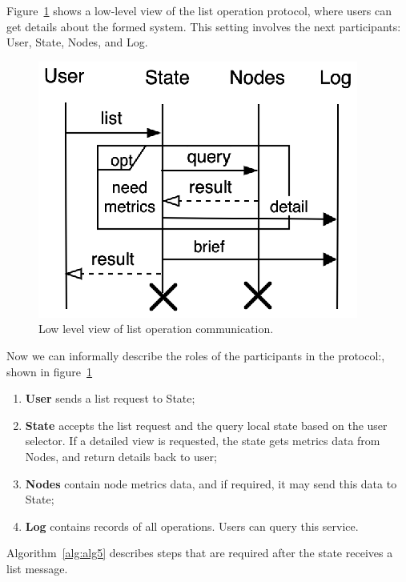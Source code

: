 Figure~\ref{fig:fig8} shows a low-level view of the list operation protocol, where users can get details about the formed system. This setting involves the next participants: User, State, Nodes, and Log. 

\begin{figure}[!htbp]
	\begin{center}
		\includegraphics[scale=0.9]{images/FIG4}
	\end{center}
	\vspace{-1.2cm}
	\caption{Low level view of list operation communication.}
	\label{fig:fig8}
\end{figure}

\noindent
Now we can informally describe the roles of the participants in the protocol:\label{list_protocol_informal_description}, shown in figure~\ref{fig:fig8}

\begin{enumerate}[start=1,label={(\bfseries \arabic*)}]
	\item \textbf{User} sends a list request to State;
	\item \textbf{State} accepts the list request and the query local state based on the user selector. If a detailed view is requested, the state gets metrics data from Nodes, and return details back to user;
	\item \textbf{Nodes} contain node metrics data, and if required, it may send this data to State;
	\item \textbf{Log} contains records of all operations. Users can query this service.
\end{enumerate}

\noindent
Algorithm~\ref{alg:alg5} describes steps that are required after the state receives a list message.

